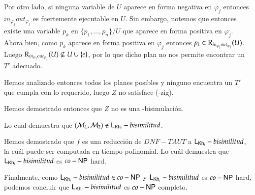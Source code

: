 \begin{demostracion}
\begin{itemize}
    Por otro lado, si ninguna variable de $U$ aparece en forma negativa en $\varphi_j$ entonces $in_{\varphi_j}out_{\varphi_j}$ es fuertemente ejecutable en $U$. Sin embargo, notemos que entonces existe una variable $p_k$ en $\{p_1,...,p_n\}/U$ que aparece en forma positiva en $\varphi_j$. Ahora bien, como $p_k$ aparece en forma positiva en $\varphi_j$ entonces $p_k \in \mathrm{R}_{in_{\varphi_j}out_{\varphi_j}}(U)$. Luego $\mathrm{R}_{in_{\varphi_j}out_{\varphi_j}}(U) \not \subseteq U \cup \{e\}$, por lo que dicho plan no nos permite encontrar un $T'$ adecuado.
    
    Hemos analizado entonces todos los planes posibles y ninguno encuentra un $T'$ que cumpla con lo requerido, luego $Z$ no satisface (\KHilogic-zig).

    Hemos demostrado entonces que $Z$ no es una \KHilogic-bisimulación.

    Lo cual demuestra que $(\mathcal{M}_1,\mathcal{M}_2) \not \in \mathsf{L}_{\mathsf{Kh}_i}-bisimilitud$.
    \end{itemize}

     Hemos demostrado que $f$ es una reducción de $DNF-TAUT$ a $\mathsf{L}_{\mathsf{Kh}_i}-bisimilitud$, la cuál puede ser computada en tiempo polinomial. Lo cuál demuestra que $\mathsf{L}_{\mathsf{Kh}_i}-bisimilitud$ es $co-\rm\textsf{NP}$ hard.

    Finalmente, como $\mathsf{L}_{\mathsf{Kh}_i}-bisimilitud \in co-\rm\textsf{NP}$ y $\mathsf{L}_{\mathsf{Kh}_i}-bisimilitud$ es $co-\rm\textsf{NP}$ hard, podemos concluir que $\mathsf{L}_{\mathsf{Kh}_i}-bisimilitud$ es $co-\rm\textsf{NP}$ completo.
    
\end{demostracion}
